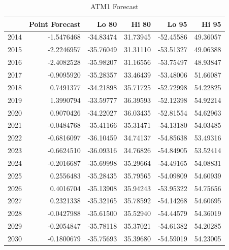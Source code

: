 \documentclass[openany]{book}
\begin{document}
\begin{table}[H]

\caption{\label{tab:unnamed-chunk-8}ATM1 Forecast}
\centering
\begin{tabular}{l|r|r|r|r|r}
\hline
\textbf{ } & \textbf{Point Forecast} & \textbf{Lo 80} & \textbf{Hi 80} & \textbf{Lo 95} & \textbf{Hi 95}\\
\hline
\rowcolor{gray!6}  2014 & -1.5476468 & -34.83474 & 31.73945 & -52.45586 & 49.36057\\
\hline
2015 & -2.2246957 & -35.76049 & 31.31110 & -53.51327 & 49.06388\\
\hline
\rowcolor{gray!6}  2016 & -2.4082528 & -35.98207 & 31.16556 & -53.75497 & 48.93847\\
\hline
2017 & -0.9095920 & -35.28357 & 33.46439 & -53.48006 & 51.66087\\
\hline
\rowcolor{gray!6}  2018 & 0.7491377 & -34.21898 & 35.71725 & -52.72998 & 54.22825\\
\hline
2019 & 1.3990794 & -33.59777 & 36.39593 & -52.12398 & 54.92214\\
\hline
\rowcolor{gray!6}  2020 & 0.9070426 & -34.22027 & 36.03435 & -52.81554 & 54.62963\\
\hline
2021 & -0.0484768 & -35.41166 & 35.31471 & -54.13180 & 54.03485\\
\hline
\rowcolor{gray!6}  2022 & -0.6816097 & -36.10459 & 34.74137 & -54.85638 & 53.49316\\
\hline
2023 & -0.6624510 & -36.09316 & 34.76826 & -54.84905 & 53.52414\\
\hline
\rowcolor{gray!6}  2024 & -0.2016687 & -35.69998 & 35.29664 & -54.49165 & 54.08831\\
\hline
2025 & 0.2556483 & -35.28435 & 35.79565 & -54.09809 & 54.60939\\
\hline
\rowcolor{gray!6}  2026 & 0.4016704 & -35.13908 & 35.94243 & -53.95322 & 54.75656\\
\hline
2027 & 0.2321338 & -35.32165 & 35.78592 & -54.14268 & 54.60695\\
\hline
\rowcolor{gray!6}  2028 & -0.0427988 & -35.61500 & 35.52940 & -54.44579 & 54.36019\\
\hline
2029 & -0.2054847 & -35.78118 & 35.37021 & -54.61382 & 54.20285\\
\hline
\rowcolor{gray!6}  2030 & -0.1800679 & -35.75693 & 35.39680 & -54.59019 & 54.23005\\
\hline
\end{tabular}
\end{table}
\end{document}
